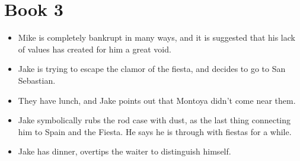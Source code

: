 \documentclass[11pt]{article}
\begin{document}
\section{Book 3}
\begin{itemize}
	\item Mike is completely bankrupt in many ways, and it is suggested that his
		lack of values has created for him a great void.
	\item Jake is trying to escape the clamor of the fiesta, and decides to go
		to San Sebastian.
	\item They have lunch, and Jake points out that Montoya didn't come near them.
	\item Jake symbolically rubs the rod case with dust, as the last thing
		connecting him to Spain and the Fiesta.  He says he is through with fiestas
		for a while.
	\item Jake has dinner, overtips the waiter to distinguish himself.
\end{itemize}
\end{document}
